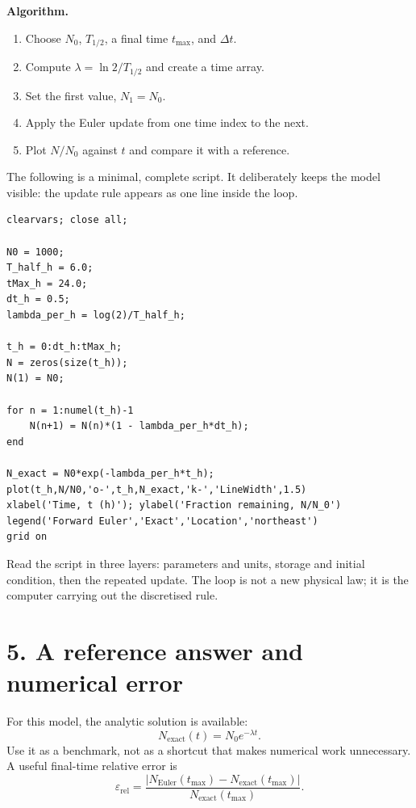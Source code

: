 \documentclass[11pt,a4paper]{article}
\begin{document}
\textbf{Algorithm.}
\begin{enumerate}[nosep,leftmargin=6mm]
  \item Choose $N_0$, $T_{1/2}$, a final time $t_{\max}$, and $\Delta t$.
  \item Compute $\lambda=\ln2/T_{1/2}$ and create a time array.
  \item Set the first value, $N_1=N_0$.
  \item Apply the Euler update from one time index to the next.
  \item Plot $N/N_0$ against $t$ and compare it with a reference.
\end{enumerate}

The following is a minimal, complete script. It deliberately keeps the model visible: the update rule appears as one line inside the loop.
\begin{lstlisting}[style=matlabstyle,caption={A first Euler simulation}]
clearvars; close all;

N0 = 1000;
T_half_h = 6.0;
tMax_h = 24.0;
dt_h = 0.5;
lambda_per_h = log(2)/T_half_h;

t_h = 0:dt_h:tMax_h;
N = zeros(size(t_h));
N(1) = N0;

for n = 1:numel(t_h)-1
    N(n+1) = N(n)*(1 - lambda_per_h*dt_h);
end

N_exact = N0*exp(-lambda_per_h*t_h);
plot(t_h,N/N0,'o-',t_h,N_exact,'k-','LineWidth',1.5)
xlabel('Time, t (h)'); ylabel('Fraction remaining, N/N_0')
legend('Forward Euler','Exact','Location','northeast')
grid on
\end{lstlisting}

Read the script in three layers: parameters and units, storage and initial condition, then the repeated update. The loop is not a new physical law; it is the computer carrying out the discretised rule.

\section*{5. A reference answer and numerical error}
For this model, the analytic solution is available:
\begin{equation}
  N_{\mathrm{exact}}(t)=N_0e^{-\lambda t}.
\end{equation}
Use it as a benchmark, not as a shortcut that makes numerical work unnecessary. A useful final-time relative error is
\begin{equation}
  \varepsilon_{\mathrm{rel}}=\frac{\left|N_{\mathrm{Euler}}(t_{\max})-N_{\mathrm{exact}}(t_{\max})\right|}{N_{\mathrm{exact}}(t_{\max})}.
\end{equation}
\end{document}
